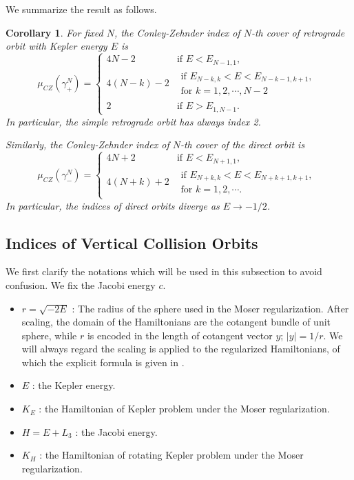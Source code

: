 \documentclass{amsart}
\newcommand{\g}{\gamma}
\newtheorem{cor}[thm]{Corollary}
\begin{document}
We summarize the result as follows.
\begin{cor}\label{Corollary - Index of Planar Orbits}
	For fixed $N$, the Conley-Zehnder index of $N$-th cover of retrograde orbit with Kepler energy $E$ is
	$$
	\mu_{CZ}(\g_+^N)=\left\{\begin{array}{cc}
		4N-2&   \text{if }E<E_{N-1,1},\\
		4(N-k)-2&\begin{array}{c}\text{if }E_{N-k,k}<E<E_{N-k-1,k+1},\\
			\text{for }k=1,2,\cdots,N-2\end{array}\\
		2 &\text{if }E>E_{1,N-1}.
	\end{array}
	\right.
	$$
	In particular, the simple retrograde orbit has always index 2.
	
	Similarly, the Conley-Zehnder index of $N$-th cover of the direct orbit is
	$$
	\mu_{CZ}(\g_-^N)=\left\{\begin{array}{cc}
		4N+2&   \text{if }E<E_{N+1,1},\\
		4(N+k)+2&   \begin{array}{c}\text{if }E_{N+k,k}<E<E_{N+k+1,k+1},\\
			\text{for }k=1,2,\cdots.\end{array}
	\end{array}
	\right.
	$$
	In particular, the indices of direct orbits diverge as $E\to -1/2$.
\end{cor}



\subsection{Indices of Vertical Collision Orbits}\label{Subsection - Vertical index}

We first clarify the notations which will be used in this subsection to avoid confusion.
We fix the Jacobi energy $c$.
\begin{itemize}
	\item $r=\sqrt{-2E}$ : The radius of the sphere used in the Moser regularization.
	After scaling, the domain of the Hamiltonians are the cotangent bundle of unit sphere, while $r$ is encoded in the length of cotangent vector $y$; $|y|=1/r$.
	We will always regard the scaling is applied to the regularized Hamiltonians, of which the explicit formula is given in .
	\item $E$ : the Kepler energy.
	\item $K_E$ : the Hamiltonian of Kepler problem under the Moser regularization.
	\item $H = E+L_3$ : the Jacobi energy.
	\item $K_H$ : the Hamiltonian of rotating Kepler problem under the Moser regularization.
\end{itemize}
\end{document}
